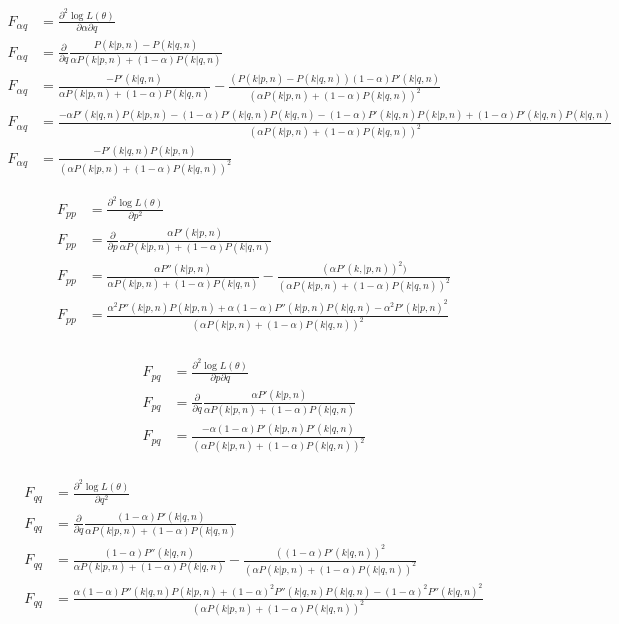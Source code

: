 \begin{align*}
F_{\alpha q} &= \frac{\partial^2\log L(\mathbb{\theta})}{\partial\alpha\partial q} \\
F_{\alpha q} &= \frac{\partial}{\partial q}\frac{P(k | p, n) - P(k | q, n)}{\alpha P(k | p, n) + (1-\alpha)P(k | q, n)} \\
F_{\alpha q} &= \frac{-P'(k | q, n)}{\alpha P(k | p, n) + (1-\alpha)P(k | q, n)} - \frac{(P(k | p, n) - P(k | q, n))(1 - \alpha)P'(k | q, n)}{(\alpha P(k | p, n) + (1 - \alpha) P(k | q, n))^2} \\
F_{\alpha q} &= \frac{-\alpha P'(k | q, n)P(k | p, n) - (1 - \alpha)P'(k | q, n)P(k | q, n) - (1 - \alpha)P'(k | q, n)P(k | p, n) + (1 - \alpha)P'(k | q, n)P(k | q, n)}{(\alpha P(k | p, n) + (1 - \alpha) P(k | q, n))^2} \\
F_{\alpha q} &= \frac{-P'(k | q, n)P(k | p, n)}{(\alpha P(k | p, n) + (1 - \alpha) P(k | q, n))^2}
\end{align*}

\begin{align*}
F_{pp} &= \frac{\partial^2\log L(\mathbb{\theta})}{\partial p^2} \\
F_{pp} &= \frac{\partial}{\partial p}\frac{\alpha P'(k | p, n)}{\alpha P(k | p, n) + (1-\alpha)P(k | q, n)} \\ 
F_{pp} &= \frac{\alpha P''(k | p, n)}{\alpha P(k | p, n) + (1-\alpha)P(k | q, n)} - \frac{(\alpha P'(k, | p, n))^2)}{(\alpha P(k | p, n) + (1 - \alpha) P(k | q, n))^2} \\
F_{pp} &= \frac{\alpha^2P''(k | p, n)P(k | p, n) + \alpha(1 - \alpha)P''(k | p, n)P(k | q, n) - \alpha^2P'(k | p, n)^2}{(\alpha P(k | p, n) + (1 - \alpha) P(k | q, n))^2} \\
\end{align*}

\begin{align*}
F_{pq} &= \frac{\partial^2\log L(\mathbb{\theta})}{\partial p\partial q} \\
F_{pq} &= \frac{\partial}{\partial q}\frac{\alpha P'(k | p, n)}{\alpha P(k | p, n) + (1-\alpha)P(k | q, n)} \\ 
F_{pq} &= \frac{-\alpha(1 - \alpha)P'(k | p, n)P'(k | q, n)}{(\alpha P(k | p, n) + (1 - \alpha) P(k | q, n))^2} \\
\end{align*}

\begin{align*}
F_{qq} &= \frac{\partial^2\log L(\mathbb{\theta})}{\partial q^2} \\
F_{qq} &= \frac{\partial}{\partial q}\frac{(1 - \alpha) P'(k | q, n)}{\alpha P(k | p, n) + (1-\alpha)P(k | q, n)} \\
F_{qq} &= \frac{(1 - \alpha) P''(k | q, n)}{\alpha P(k | p, n) + (1-\alpha)P(k | q, n)} - \frac{((1 - \alpha)P'(k | q, n))^2}{(\alpha P(k | p, n) + (1 - \alpha) P(k | q, n))^2} \\
F_{qq} &= \frac{\alpha(1 - \alpha)P''(k | q, n)P(k | p, n) + (1 - \alpha)^2P''(k | q, n)P(k | q, n) - (1 - \alpha)^2P''(k | q, n)^2}{(\alpha P(k | p, n) + (1 - \alpha) P(k | q, n))^2}
\end{align*}

